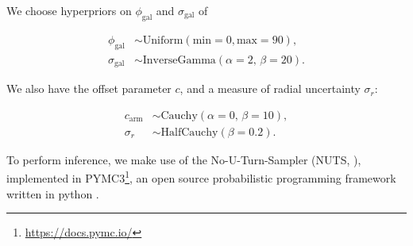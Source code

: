 We choose hyperpriors on $\phi_\mathrm{gal}$ and $\sigma_\mathrm{gal}$ of

\begin{align}
  \phi_\mathrm{gal} &\sim \mathrm{Uniform}(\mathrm{min}=0, \mathrm{max}=90),\\
  \sigma_\mathrm{gal} &\sim \mathrm{InverseGamma}(\alpha=2,\,\beta=20).
\end{align}

We also have the offset parameter $c$, and a measure of radial uncertainty $\sigma_r$:

\begin{align}
  c_\mathrm{arm} &\sim \mathrm{Cauchy}(\alpha=0,\,\beta=10),\\
  \sigma_r &\sim \mathrm{HalfCauchy}(\beta=0.2).
\end{align}


To perform inference, we make use of the No-U-Turn-Sampler (NUTS, \citealt{2011arXiv1111.4246H}), implemented in PYMC3\footnote{\url{https://docs.pymc.io/}}, an open source probabilistic programming framework written in python \citep{pymc3_paper}.
